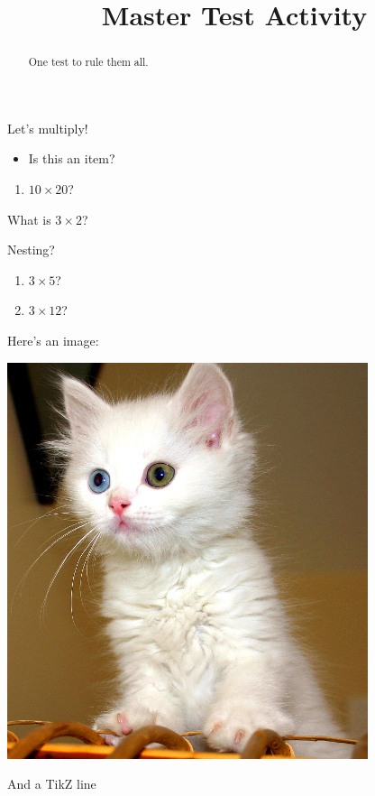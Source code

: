 \documentclass{ximera}
\title{Master Test Activity}
\begin{document}
\begin{abstract}
  One test to rule them all.
\end{abstract}

Let's multiply!

\begin{itemize}
	\item Is this an item?  
\end{itemize}

\begin{enumerate}[align=left]
	\item \begin{question} $10 \times 20$?  \end{question}
\end{enumerate}

\begin{question}
	What is $3 \times 2$?  
	\begin{question}
		Nesting? 
	\end{question}
	\begin{enumerate}
		\item \begin{prompt} $3 \times 5$? \end{prompt}  
		\item $3 \times 12$? 
	\end{enumerate}
\end{question}

Here's an image:
\begin{image}
	\includegraphics{testCat.jpg}
\end{image}
And a TikZ line
\begin{image}
\end{image}
\end{document}
